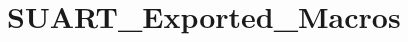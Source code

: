 \hypertarget{group___s_u_a_r_t___exported___macros}{}\section{S\+U\+A\+R\+T\+\_\+\+Exported\+\_\+\+Macros}
\label{group___s_u_a_r_t___exported___macros}
